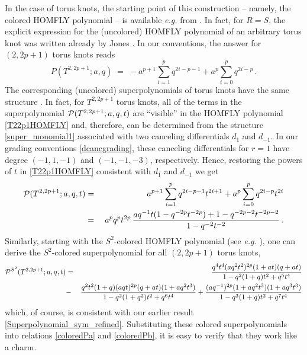 \documentclass[hyper,letterpaper]{JHEP3}
\newcommand{\be}{\begin{equation}}
\newcommand{\ee}{\end{equation}}
\renewcommand{\P}{{\cal P}}
\begin{document}
In the case of torus knots, the starting point of this construction -- namely, the colored HOMFLY polynomial --
is available {\it e.g.} from \cite{LinZheng}.
In fact, for $R=S$, the explicit expression for the (uncolored) HOMFLY polynomial
of an arbitrary torus knot was written already by Jones \cite{Jones}.
In our conventions, the answer for $(2,2p+1)$ torus knots reads
\be
P (T^{2,2p+1}; a,q) \; = \; - a^{p+1} \sum_{i=1}^p q^{2i - p - 1} + a^{p} \sum_{i=0}^p q^{2i - p} \,.
\label{T22p1HOMFLY}
\ee
The corresponding (uncolored) superpolynomials of torus knots have the same structure \cite{DGR}.
In fact, for $T^{2,2p+1}$ torus knots, all of the terms in the superpolynomial $\P (T^{2,2p+1}; a,q,t)$
are ``visible'' in the HOMFLY polynomial \eqref{T22p1HOMFLY} and, therefore, can be determined from
the structure \eqref{super_monomial1} associated with two canceling differentials $d_1$ and $d_{-1}$.
In our grading conventions \eqref{dcancgrading}, these canceling differentials for $r=1$
have degree $(-1,1,-1)$ and $(-1,-1,-3)$, respectively.
Hence, restoring the powers of $t$ in \eqref{T22p1HOMFLY} consistent with $d_1$ and $d_{-1}$ we get
\begin{eqnarray}
\P (T^{2,2p+1}; a,q,t) & = & a^{p+1} \sum_{i=1}^p q^{2i - p - 1} t^{2i+1} + a^{p} \sum_{i=0}^p q^{2i - p} t^{2i} \nonumber \\
& = & \; a^{p} q^{p} t^{2p} \, \frac{a q^{-1} t (1 - q^{-2p} t^{-2p}) + 1 - q^{-2p-2} t^{-2p-2} }{1 - q^{-2} t^{-2}} \,. \nonumber
\end{eqnarray}
Similarly, starting with the $S^2$-colored HOMFLY polynomial (see {\it e.g.} \cite{LinZheng}),
one can derive the $S^2$-colored superpolynomial for all $(2,2p+1)$ torus knots,
\begin{eqnarray}
\P^{S^2} (T^{2,2p+1}; a,q,t)
& = & \frac{q^4 t^4 (a q^2 t^2)^{2 p} (1 + a t) (q + a t)}{1 - q^2 (1 + q) t^2 + q^5 t^4} \label{PS2p} \\
& - & \frac{q^2 t^2 (1 + q) (a q t)^{2 p} (q + a t) (1 + a q^2 t^3)}{1 - q^2 (1 + q^2) t^2 + q^6 t^4}
+ \frac{(a q^{-1})^{2 p} (1 + a q^2 t^3) (1 + a q^3 t^3)}{1 - q^3 (1 + q) t^2 + q^7 t^4} \nonumber
\end{eqnarray}
which, of course, is consistent with our earlier result \eqref{Superpolynomial_sym_refined}.
Substituting these colored superpolynomials into relations \eqref{coloredPa} and \eqref{coloredPb},
it is easy to verify that they work like a charm.\\
\end{document}
